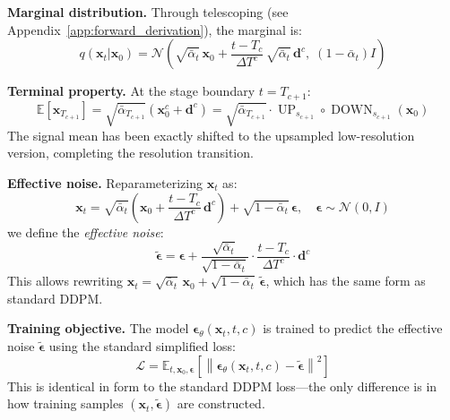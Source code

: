 \documentclass[10pt]{article}
\DeclareMathOperator{\DOWN}{DOWN}
\DeclareMathOperator{\UP}{UP}
\newcommand{\E}{\mathbb{E}}
\newcommand{\N}{\mathcal{N}}
\newcommand{\bx}{\bm{x}}
\newcommand{\beps}{\bm{\epsilon}}
\newcommand{\bd}{\bm{d}}
\begin{document}
\textbf{Marginal distribution.} Through telescoping (see Appendix~\ref{app:forward_derivation}), the marginal is:
\begin{equation}
    q(\bx_t | \bx_0) = \N\left(\sqrt{\bar{\alpha}_t}\, \bx_0 + \frac{t - T_c}{\Delta T^c}\, \sqrt{\bar{\alpha}_t}\, \bd^c,\; (1 - \bar{\alpha}_t) I\right)
    \label{eq:marginal}
\end{equation}

\textbf{Terminal property.} At the stage boundary $t = T_{c+1}$:
\begin{equation}
    \E[\bx_{T_{c+1}}] = \sqrt{\bar{\alpha}_{T_{c+1}}} \left(\bx_0^c + \bd^c\right) = \sqrt{\bar{\alpha}_{T_{c+1}}} \cdot \UP_{s_{c+1}} \circ \DOWN_{s_{c+1}}(\bx_0)
\end{equation}
The signal mean has been exactly shifted to the upsampled low-resolution version, completing the resolution transition.

\textbf{Effective noise.} Reparameterizing $\bx_t$ as:
\begin{equation}
    \bx_t = \sqrt{\bar{\alpha}_t}\left(\bx_0 + \frac{t - T_c}{\Delta T^c}\, \bd^c\right) + \sqrt{1 - \bar{\alpha}_t}\, \beps, \quad \beps \sim \N(0, I)
\end{equation}
we define the \emph{effective noise}:
\begin{equation}
    \tilde{\beps} = \beps + \frac{\sqrt{\bar{\alpha}_t}}{\sqrt{1 - \bar{\alpha}_t}} \cdot \frac{t - T_c}{\Delta T^c} \cdot \bd^c
    \label{eq:effective_noise}
\end{equation}
This allows rewriting $\bx_t = \sqrt{\bar{\alpha}_t}\, \bx_0 + \sqrt{1 - \bar{\alpha}_t}\, \tilde{\beps}$, which has the same form as standard DDPM.

\textbf{Training objective.} The model $\beps_\theta(\bx_t, t, c)$ is trained to predict the effective noise $\tilde{\beps}$ using the standard simplified loss:
\begin{equation}
    \mathcal{L} = \E_{t, \bx_0, \beps}\left[\left\|\beps_\theta(\bx_t, t, c) - \tilde{\beps}\right\|^2\right]
    \label{eq:loss}
\end{equation}
This is identical in form to the standard DDPM loss---the only difference is in how training samples $(\bx_t, \tilde{\beps})$ are constructed.
\end{document}
